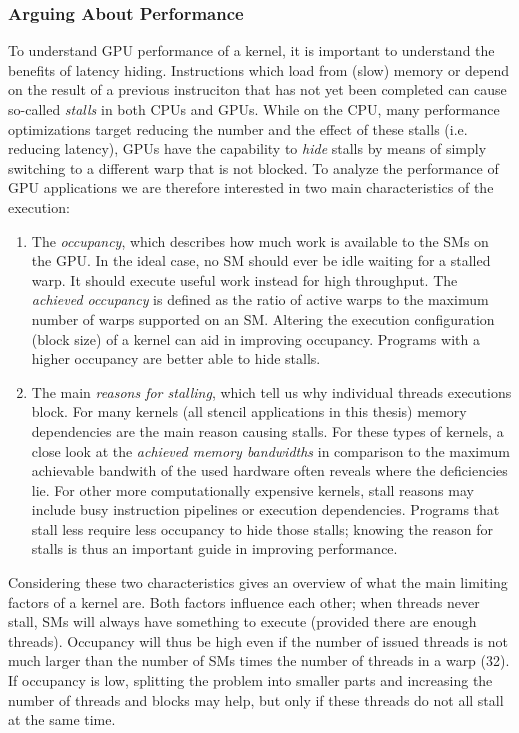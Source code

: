 \subsubsection{Arguing About Performance}

To understand GPU performance of a kernel, it is important to understand the benefits of latency hiding. Instructions which load from (slow) memory or depend on the result of a previous instruciton that has not yet been completed can cause so-called \emph{stalls} in both CPUs and GPUs. While on the CPU, many performance optimizations target reducing the number and the effect of these stalls (i.e. reducing latency), GPUs have the capability to \emph{hide} stalls by means of simply switching to a different warp that is not blocked. To analyze the performance of GPU applications we are therefore interested in two main characteristics of the execution:

\begin{enumerate}
	\item The \emph{occupancy}, which describes how much work is available to the SMs on the GPU. In the ideal case, no SM should ever be idle waiting for a stalled warp. It should execute useful work instead for high throughput. The \emph{achieved occupancy} is defined as the ratio of active warps to the maximum number of warps supported on an SM. Altering the execution configuration (block size) of a kernel can aid in improving occupancy. Programs with a higher occupancy are better able to hide stalls.
	\item The main \emph{reasons for stalling}, which tell us why individual threads executions block. For many kernels (all stencil applications in this thesis) memory dependencies are the main reason causing stalls. For these types of kernels, a close look at the \emph{achieved memory bandwidths} in comparison to the maximum achievable bandwith of the used hardware often reveals where the deficiencies lie. For other more computationally expensive kernels, stall reasons may include busy instruction pipelines or execution dependencies. Programs that stall less require less occupancy to hide those stalls; knowing the reason for stalls is thus an important guide in improving performance.
\end{enumerate}

Considering these two characteristics gives an overview of what the main limiting factors of a kernel are. Both factors influence each other; when threads never stall, SMs will always have something to execute (provided there are enough threads). Occupancy will thus be high even if the number of issued threads is not much larger than the number of SMs times the number of threads in a warp (32). If occupancy is low, splitting the problem into smaller parts and increasing the number of threads and blocks may help, but only if these threads do not all stall at the same time.


